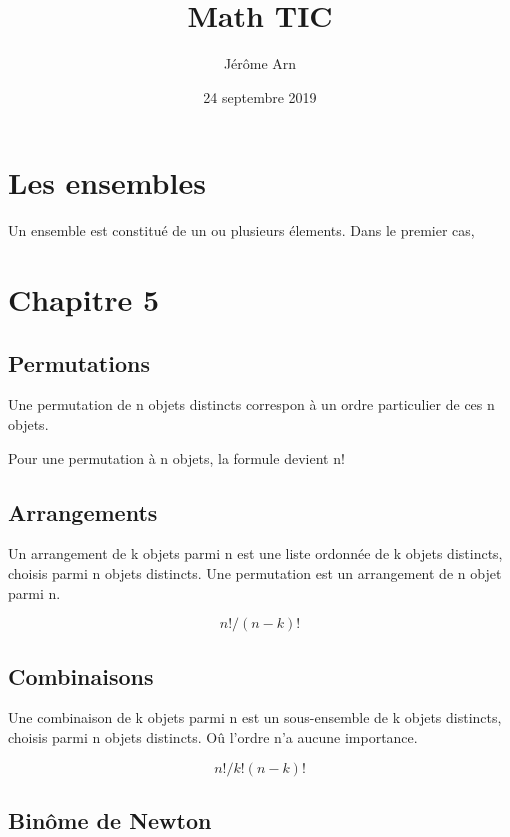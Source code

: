 \documentclass{article}
\title{Math TIC}
\author{Jérôme Arn}
\date{24 septembre 2019}
\begin{document}
\maketitle
\newpage

\tableofcontents
\newpage

\section{Les ensembles}
Un ensemble est constitué de un ou plusieurs élements. Dans le premier cas, 

\section{Chapitre 5}

\subsection{Permutations}
Une permutation de n objets distincts correspon à un ordre particulier de ces n objets. 

Pour une permutation à n objets, la formule devient n! 

\subsection{Arrangements}
Un arrangement de k objets parmi n est une liste ordonnée de k objets distincts, choisis parmi n objets distincts. Une permutation est un arrangement de n objet parmi n.  

$$ n!/(n - k)!$$ 

\subsection{Combinaisons}
Une combinaison de k objets parmi n est un sous-ensemble de k objets distincts, choisis parmi n objets distincts. Oû l'ordre n'a aucune importance. 

$$ n!/k!(n-k)!$$ 

\subsection{Binôme de Newton}
\end{document}
